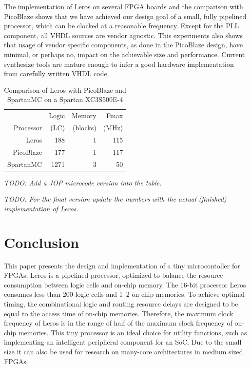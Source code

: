 \documentclass[a4paper,fontsize=10pt,twoside,DIV15,BCOR12mm,headinclude=true,footinclude=false,pagesize,bibtotoc]{scrbook}
\newcommand{\todo}[1]{{\emph{TODO: #1}}}
\begin{document}
The implementation of Leros on several FPGA boards and the comparison with PicoBlaze shows that we have achieved our design goal of a small, fully pipelined processor, which can be clocked at a reasonable frequency. Except for the PLL component, all VHDL sources are vendor agnostic. This experiments also shows that usage of vendor specific components, as done in the PicoBlaze design, have minimal, or perhaps no, impact on the achievable size and performance. Current synthesize tools are mature enough to infer a good hardware implementation from carefully written VHDL code.

\begin{table}
\small
\centering 
\caption{Comparison of Leros with PicoBlaze and SpartanMC on a Spartan XC3S500E-4}
\label{tab:comp}
\begin{tabular}{rrrr}
\toprule
 & Logic & Memory & Fmax \\
 Processor & (LC) & (blocks) & (MHz) \\
\midrule
Leros & 188 & 1 & 115 \\
PicoBlaze & 177 & 1 & 117 \\
SpartanMC & 1271 & 3 & 50 \\
\bottomrule
\end{tabular}
\end{table}
\todo{Add a JOP microcode version into the table.}

\todo{For the final version update the numbers with the actual (finished) implementation of Leros.}

\section{Conclusion}
\label{sec:conclusion}

This paper presents the design and implementation of a tiny microcontoller for FPGAs. Leros is a pipelined processor, optimized to balance the resource consumption between logic cells and on-chip memory. The 16-bit processor Leros consumes less than 200 logic cells and 1--2 on-chip memories.
To achieve optimal timing, the combinational logic and routing resource delays are designed to be equal to the access time of on-chip memories. Therefore, the maximum clock frequency of Leros is in the range of half of the maximum clock frequency of on-chip memories. This tiny processor is an ideal choice for utility functions, such as implementing an intelligent peripheral component for an SoC. Due to the small size it can also be used for research on many-core architectures in medium sized FPGAs.
\end{document}
